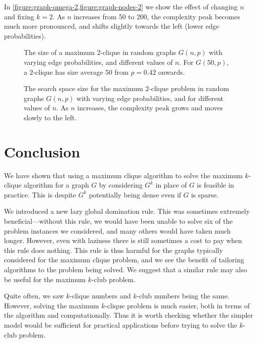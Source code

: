 \documentclass[letterpaper]{article}
\begin{document}
In \cref{figure:graph-omega-2,figure:graph-nodes-2} we show the effect of
changing $n$ and fixing $k = 2$. As $n$ increases from 50 to 200, the complexity peak becomes much
more pronounced, and shifts slightly towards the left (lower edge probabilities).

\begin{figure}[p] %
    \centering
    \caption{The size of a maximum $2$-clique in random graphs $G(n, p)$ with varying edge
        probabilities, and different values of $n$. For $G(50, p)$, a $2$-clique has size average 50
    from $p = 0.42$ onwards.}
    \label{figure:graph-omega-2}

    \vspace{1.5em}

    \caption{The search space size for the maximum $2$-clique problem in random graphs $G(n, p)$
        with varying edge probabilities, and for different values of $n$. As $n$ increases, the
    complexity peak grows and moves slowly to the left.}
    \label{figure:graph-nodes-2}
\end{figure}

\section{Conclusion}

We have shown that using a maximum clique algorithm to solve the maximum $k$-clique algorithm for a
graph $G$ by considering $G^k$ in place of $G$ is feasible in practice. This is despite $G^k$
potentially being dense even if $G$ is sparse.

We introduced a new lazy global domination rule. This was sometimes extremely beneficial---without
this rule, we would have been unable to solve six of the problem instances we considered, and many
others would have taken much longer. However, even with laziness there is still sometimes a cost to
pay when this rule does nothing. This rule is thus harmful for the graphs typically considered for
the maximum clique problem, and we see the benefit of tailoring algorithms to the problem being
solved. We suggest that a similar rule may also be useful for the maximum $k$-club problem.

Quite often, we saw $k$-clique numbers and $k$-club numbers being the same. However, solving the
maximum $k$-clique problem is much easier, both in terms of the algorithm and computationally. Thus
it is worth checking whether the simpler model would be sufficient for practical applications before
trying to solve the $k$-club problem.
\end{document}
